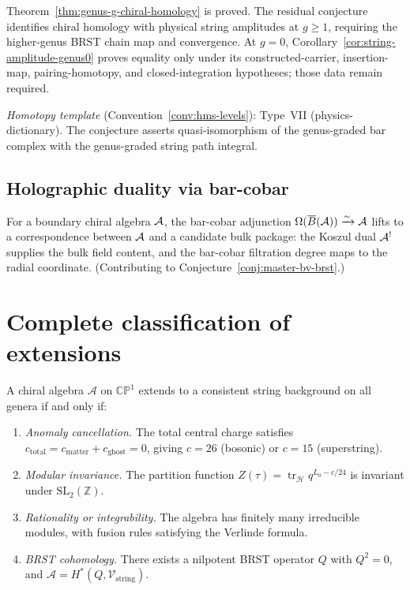 \begin{remark}[Scope]
Theorem~\ref{thm:genus-g-chiral-homology} is proved.
The residual conjecture identifies chiral homology
with physical string amplitudes at $g \geq 1$,
requiring the higher-genus BRST chain map and convergence.
At $g=0$, Corollary~\ref{cor:string-amplitude-genus0} proves equality only under its constructed-carrier, insertion-map, pairing-homotopy, and closed-integration hypotheses; those data remain required.

\emph{Homotopy template} (Convention~\ref{conv:hms-levels}): Type~VII
(physics-dictionary).  The conjecture asserts quasi-isomorphism of the
genus-graded bar complex with the genus-graded string path integral.
\end{remark}

\subsection{Holographic duality via bar-cobar}

\begin{conjecture}
\label{conj:bulk-boundary-correspondence}
For a boundary chiral algebra $\mathcal{A}$, the bar-cobar adjunction
$\Omega(\overline{B}(\mathcal{A})) \xrightarrow{\sim} \mathcal{A}$ lifts to a correspondence
between $\mathcal{A}$ and a candidate bulk package: the Koszul dual $\mathcal{A}^!$
supplies the bulk field content, and the bar-cobar filtration degree
maps to the radial coordinate.
(Contributing to Conjecture~\ref{conj:master-bv-brst}.)
\end{conjecture}

\section{Complete classification of extensions}

\begin{theorem}\label{thm:classification-extendable}
A chiral algebra $\mathcal{A}$ on $\mathbb{CP}^1$ extends to a consistent string background on all genera if and only if:
\begin{enumerate}
\item \emph{Anomaly cancellation.} The total central charge satisfies $c_{\mathrm{total}} = c_{\mathrm{matter}} + c_{\mathrm{ghost}} = 0$, giving $c = 26$ (bosonic) or $c = 15$ (superstring).
\item \emph{Modular invariance.} The partition function $Z(\tau) = \operatorname{tr}_{\mathcal{H}} q^{L_0 - c/24}$ is invariant under $\mathrm{SL}_2(\mathbb{Z})$.
\item \emph{Rationality or integrability.} The algebra has finitely many irreducible modules, with fusion rules satisfying the Verlinde formula.
\item \emph{BRST cohomology.} There exists a nilpotent BRST operator $Q$ with $Q^2 = 0$, and $\mathcal{A} = H^*(Q, \mathcal{V}_{\mathrm{string}})$.
\end{enumerate}
\end{theorem}


